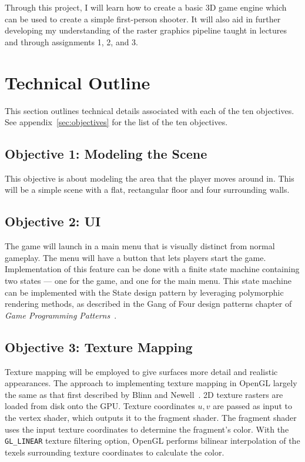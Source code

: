 \documentclass {article}
\begin{document}
Through this project, I will learn how to create a basic 3D game engine which can be used to create a simple first-person shooter. It will also aid in further developing my understanding of the raster graphics pipeline taught in lectures and through assignments 1, 2, and 3.

\newpage
\section{Technical Outline}\label{sec:tech}
This section outlines technical details associated with each of the ten objectives. See appendix~\ref{sec:objectives} for the list of the ten objectives.

\subsection{Objective 1: Modeling the Scene}
This objective is about modeling the area that the player moves around in. This will be a simple scene with a flat, rectangular floor and four surrounding walls.

\subsection{Objective 2: UI}
The game will launch in a main menu that is visually distinct from normal gameplay. The menu will have a button that lets players start the game. Implementation of this feature can be done with a finite state machine containing two states --- one for the game, and one for the main menu. This state machine can be implemented with the State design pattern by leveraging polymorphic rendering methods, as described in the Gang of Four design patterns chapter of \textit{Game Programming Patterns}~\cite{state}.

\subsection{Objective 3: Texture Mapping}
Texture mapping will be employed to give surfaces more detail and realistic appearances. The approach to implementing texture mapping in OpenGL largely the same as that first described by Blinn and Newell~\cite{texture}. 2D texture rasters are loaded from disk onto the GPU. Texture coordinates $u, v$ are passed as input to the vertex shader, which outputs it to the fragment shader. The fragment shader uses the input texture coordinates to determine the fragment's color. With the \texttt{GL\_LINEAR} texture filtering option, OpenGL performs bilinear interpolation of the texels surrounding texture coordinates to calculate the color.
\end{document}
